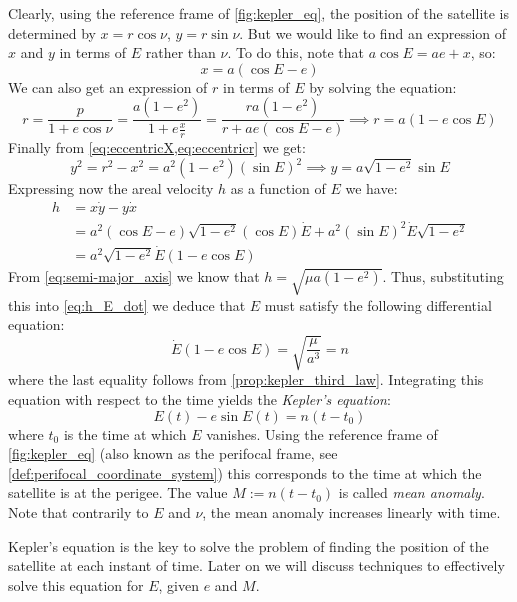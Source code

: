 \documentclass[../main.tex]{subfiles}
\begin{document}
Clearly, using the reference frame of \cref{fig:kepler_eq}, the position of the satellite is determined by $x=r\cos\nu$, $y=r\sin\nu$. But we would like to find an expression of $x$ and $y$ in terms of $E$ rather than $\nu$. To do this, note that $a\cos E=ae+x$, so:
\begin{equation}\label{eq:eccentricX}
  x=a(\cos E-e)
\end{equation}
We can also get an expression of $r$ in terms of $E$ by solving the equation:
\begin{equation}\label{eq:eccentricr}
  r=\frac{p}{1+e\cos \nu}=\frac{a(1-e^2)}{1+e\frac{x}{r}}=\frac{ra(1-e^2)}{r+ae(\cos E-e)}\implies r= a(1-e\cos E)
\end{equation}
Finally from \cref{eq:eccentricX,eq:eccentricr} we get:
\begin{equation}
  y^2=r^2-x^2=a^2(1-e^2){(\sin E)}^2\implies y=a\sqrt{1-e^2}\sin E
\end{equation}
Expressing now the areal velocity $h$ as a function of $E$ we have:
\begin{align}
  h & =x\dot{y}-y\dot{x}                                                           \\
    & =a^2(\cos E-e)\sqrt{1-e^2}(\cos E)\dot{E}+a^2{(\sin E)}^2\dot{E}\sqrt{1-e^2} \\\label{eq:h_E_dot}
    & =a^2\sqrt{1-e^2}\dot{E}(1-e\cos E)
\end{align}
From \cref{eq:semi-major_axis} we know that $h=\sqrt{\mu a(1-e^2)}$. Thus, substituting this into \cref{eq:h_E_dot} we deduce that $E$ must satisfy the following differential equation:
\begin{equation}\label{eq:kepler_equation_differential}
  \dot{E}(1-e\cos E)=\sqrt{\frac{\mu}{a^3}}=n
\end{equation}
where the last equality follows from \cref{prop:kepler_third_law}. Integrating this equation with respect to the time yields the \emph{Kepler's equation}:
\begin{equation}\label{eq:kepler_equation}
  E(t)-e\sin E(t)=n(t-t_0)
\end{equation}
where $t_0$ is the time at which $E$ vanishes. Using the reference frame of \cref{fig:kepler_eq} (also known as the perifocal frame, see \cref{def:perifocal_coordinate_system}) this corresponds to the time at which the satellite is at the perigee. The value $M:=n(t-t_0)$ is called \emph{mean anomaly}. Note that contrarily to $E$ and $\nu$, the mean anomaly increases linearly with time.

Kepler's equation is the key to solve the problem of finding the position of the satellite at each instant of time. Later on we will discuss techniques to effectively solve this equation for $E$, given $e$ and $M$.
\end{document}
